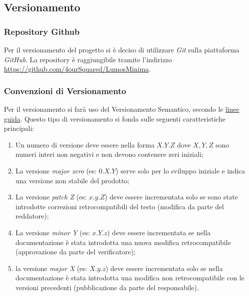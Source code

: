 \documentclass[a4paper, 12pt]{article}
\begin{document}
\subsection{Versionamento}
\subsubsection{Repository Github}
Per il versionamento del progetto si è deciso di utilizzare \textit{Git} sulla piattaforma \textit{GitHub}. La repository è raggiungibile tramite l'indirizzo \href{https://github.com/4ourSquared/LumosMinima}{https://github.com/4ourSquared/LumosMinima}.
\subsubsection{Convenzioni di Versionamento}
Per il versionamento si farà uso del Versionamento Semantico, secondo le \href{https://semver.org/lang/it/#specifica-di-versionamento-semantico-semver}{linee guida}.\newline
Questo tipo di versionamento si fonda sulle seguenti caratteristiche principali:
\begin{enumerate}
    \item Un numero di versione deve essere nella forma $X.Y.Z$ dove $X,Y,Z$ sono numeri interi non negativi e non devono contenere zeri iniziali;
    \item La versione \textit{major zero} (es: $0.X.Y$) serve solo per lo sviluppo iniziale e indica una versione non stabile del prodotto;
    \item La versione \textit{patch Z} (es: $x.y.Z$) deve essere incrementata solo se sono state introdotte correzioni retrocompatibili del testo (modifica da parte del reddatore);
    \item La versione \textit{minor Y} (es: $x.Y.z$) deve essere incrementata se nella documentazione è stata introdotta una nuova modifica retrocompatibile (approvazione da parte del verificatore);
    \item la versione \textit{major X} (es: $X.y.z$) deve essere incrementata solo se nella documentazione è stata introdotta una modifica non retrocompatibile con le versioni precedenti (pubblicazione da parte del responsabile).
\end{enumerate}
\end{document}
